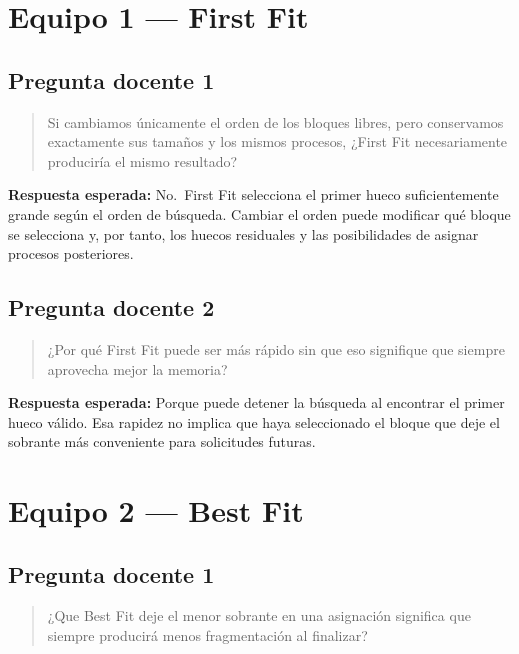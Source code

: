 \documentclass[
  spanish,
  letterpaper,
]{scrbook}
\begin{document}
\section{Equipo 1 --- First Fit}\label{equipo-1-first-fit-1}

\subsection{Pregunta docente 1}\label{pregunta-docente-1}

\begin{quote}
Si cambiamos únicamente el orden de los bloques libres, pero conservamos
exactamente sus tamaños y los mismos procesos, ¿First Fit necesariamente
produciría el mismo resultado?
\end{quote}

\textbf{Respuesta esperada:} No.~First Fit selecciona el primer hueco
suficientemente grande según el orden de búsqueda. Cambiar el orden
puede modificar qué bloque se selecciona y, por tanto, los huecos
residuales y las posibilidades de asignar procesos posteriores.

\subsection{Pregunta docente 2}\label{pregunta-docente-2}

\begin{quote}
¿Por qué First Fit puede ser más rápido sin que eso signifique que
siempre aprovecha mejor la memoria?
\end{quote}

\textbf{Respuesta esperada:} Porque puede detener la búsqueda al
encontrar el primer hueco válido. Esa rapidez no implica que haya
seleccionado el bloque que deje el sobrante más conveniente para
solicitudes futuras.

\section{Equipo 2 --- Best Fit}\label{equipo-2-best-fit-1}

\subsection{Pregunta docente 1}\label{pregunta-docente-1-1}

\begin{quote}
¿Que Best Fit deje el menor sobrante en una asignación significa que
siempre producirá menos fragmentación al finalizar?
\end{quote}
\end{document}
